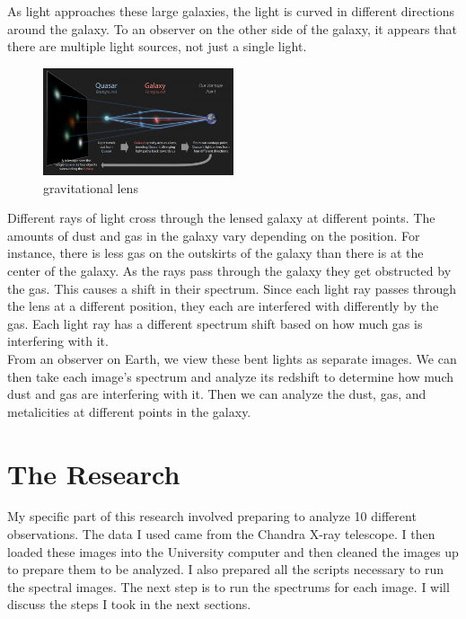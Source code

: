 \documentclass[12pt]{report}
\begin{document}
As light approaches these large galaxies, the light is curved in different directions around the galaxy. To an observer on the other side of the galaxy, it appears that there are multiple light sources, not just a single light.

\begin{figure}[H]
    \centering
    \includegraphics[width=0.5\textwidth]{Images/Lensing.jpeg}
    \caption{gravitational lens\cite{earthsky.com_2021}}
    \label{fig:gravitational lens}
\end{figure}

Different rays of light cross through the lensed galaxy at different points. The amounts of dust and gas in the galaxy vary depending on the position. For instance, there is less gas on the outskirts of the galaxy than there is at the center of the galaxy. As the rays pass through the galaxy they get obstructed by the gas. This causes a shift in their spectrum. Since each light ray passes through the lens at a different position, they each are interfered with differently by the gas. Each light ray has a different spectrum shift based on how much gas is interfering with it.\\

From an observer on Earth, we view these bent lights as separate images. We can then take each image's spectrum and analyze its redshift to determine how much dust and gas are interfering with it. Then we can analyze the dust, gas, and metalicities at different points in the galaxy.


\chapter{The Research}
My specific part of this research involved preparing to analyze 10 different observations. The data I used came from the Chandra X-ray telescope. I then loaded these images into the University computer and then cleaned the images up to prepare them to be analyzed. I also prepared all the scripts necessary to run the spectral images. The next step is to run the spectrums for each image. I will discuss the steps I took in the next sections.
\end{document}
